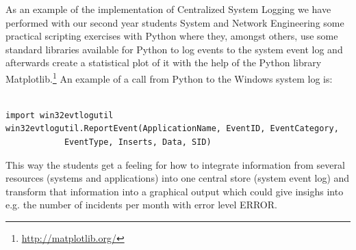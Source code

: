 As an example of the implementation of {\sc Centralized System Logging} we have performed with our second year students System and Network Engineering some practical scripting exercises with Python where they, amongst others, use some standard libraries available for Python to log events to the system event log and afterwards create a statistical plot of it with the help of the Python library Matplotlib.\footnote{\url{http://matplotlib.org/}} 
An example of a call from Python to the Windows system log is:

               
\lstset{language=Python}

\begin{lstlisting}

import win32evtlogutil
win32evtlogutil.ReportEvent(ApplicationName, EventID, EventCategory,
    		EventType, Inserts, Data, SID)

\end{lstlisting}


This way the students get a feeling for how to integrate information from several resources (systems and applications) into one central store (system event log) and transform that information into a graphical output which could give insighs into e.g. the number of incidents per month with error level ERROR.




